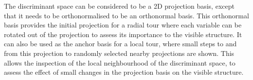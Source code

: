 \documentclass[
  letterpaper,
]{krantz}
\begin{document}
\begin{table}

\caption{\label{tbl-ds-coef-pdf}Coefficients of the discriminant space,
original and othonormalised. LD1 is the direction where Gentoo is
separated from the others, and the coefficients suggest this is due to a
contrast between bd and fl/bm. LD2 is where Adelie is different from
Chinstrap, which is generated by a contrast between bl and bm.}


\end{table}%

The discriminant space can be considered to be a 2D projection basis,
except that it needs to be orthonormalised to be an orthonormal basis.
This orthonormal basis provides the initial projection for a radial tour
where each variable can be rotated out of the projection to assess its
importance to the visible structure. It can also be used as the anchor
basis for a local tour, where small steps to and from this projection to
randomly selected nearby projections are shown. This allows the
inspection of the local neighbourhood of the discriminant space, to
assess the effect of small changes in the projection basis on the
visible structure.

 
\end{document}
